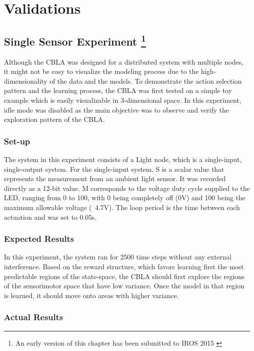 \chapter{Validations} \label{chap:validations}


\section[Single Sensor Experiment]
{Single Sensor Experiment
	\footnote{An early version of this chapter has been submitted to IROS 2015 \cite{Chan2015} }} \label{sec:single-sensor}

Although the CBLA was designed for a distributed system with multiple nodes, it might not be easy to visualize the modeling process due to the high-dimensionality of the data and the models. To demonstrate the action selection pattern and the learning process, the CBLA was first tested on a simple toy example which is easily visualizable in 3-dimensional space.  In this experiment, idle mode was disabled as the main objective was to observe and verify the exploration pattern of the CBLA. 

\subsection{Set-up}
The system in this experiment consists of a Light node, which is a single-input, single-output system. For the single-input system, S is a scalar value that represents the measurement from an ambient light sensor. It was recorded directly as a 12-bit value. M corresponds to the voltage duty cycle supplied to the LED, ranging from 0 to 100, with 0 being completely off (0V) and 100 being the maximum allowable voltage (~4.7V).  The loop period is the time between each actuation and was set to 0.05s.

\subsection{Expected Results}
In this experiment, the system ran for 2500 time steps without any external interference. 
Based on the reward structure, which favors learning first the most predictable regions of the state-space, the CBLA should first explore the regions of the sensorimotor space that have low variance. Once the model in that region is learned, it should move onto areas with higher variance.

\subsection{Actual Results}

